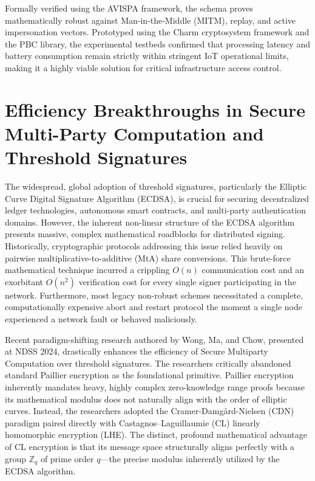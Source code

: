 \documentclass[11pt, a4paper]{article}
\begin{document}
Formally verified using the AVISPA framework, the schema proves mathematically robust against Man-in-the-Middle (MITM), replay, and active impersonation vectors. Prototyped using the Charm cryptosystem framework and the PBC library, the experimental testbeds confirmed that processing latency and battery consumption remain strictly within stringent IoT operational limits, making it a highly viable solution for critical infrastructure access control.

\section*{Efficiency Breakthroughs in Secure Multi-Party Computation and Threshold Signatures}
The widespread, global adoption of threshold signatures, particularly the Elliptic Curve Digital Signature Algorithm (ECDSA), is crucial for securing decentralized ledger technologies, autonomous smart contracts, and multi-party authentication domains. However, the inherent non-linear structure of the ECDSA algorithm presents massive, complex mathematical roadblocks for distributed signing. Historically, cryptographic protocols addressing this issue relied heavily on pairwise multiplicative-to-additive (MtA) share conversions. This brute-force mathematical technique incurred a crippling $O(n)$ communication cost and an exorbitant $O(n^2)$ verification cost for every single signer participating in the network. Furthermore, most legacy non-robust schemes necessitated a complete, computationally expensive abort and restart protocol the moment a single node experienced a network fault or behaved maliciously.

Recent paradigm-shifting research authored by Wong, Ma, and Chow, presented at NDSS 2024, drastically enhances the efficiency of Secure Multiparty Computation over threshold signatures. The researchers critically abandoned standard Paillier encryption as the foundational primitive. Paillier encryption inherently mandates heavy, highly complex zero-knowledge range proofs because its mathematical modulus does not naturally align with the order of elliptic curves. Instead, the researchers adopted the Cramer-Damgård-Nielsen (CDN) paradigm paired directly with Castagnos–Laguillaumie (CL) linearly homomorphic encryption (LHE). The distinct, profound mathematical advantage of CL encryption is that its message space structurally aligns perfectly with a group $\mathbb{Z}_q$ of prime order $q$—the precise modulus inherently utilized by the ECDSA algorithm.
\end{document}
